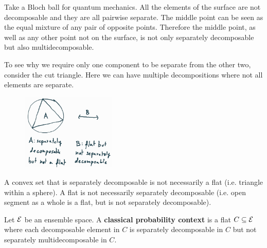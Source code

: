 \begin{mathSection}
\begin{remark}
		Take a Bloch ball for quantum mechanics. All the elements of the surface are not decomposable and they are all pairwise separate. The middle point can be seen as the equal mixture of any pair of opposite points. Therefore the middle point, as well as any other point not on the surface, is not only separately decomposable but also multidecomposable.
		
		To see why we require only one component to be separate from the other two, consider the cut triangle. Here we can have multiple decompositions where not all elements are separate.
	\end{remark}
	
	\begin{figure}[H]
		\centering
		\includegraphics[width=0.4\textwidth]{tempimages/SeparableButNotFlat.jpg}
	\end{figure}
	
	\begin{remark}
		A convex set that is separately decomposable is not necessarily a flat (i.e. triangle within a sphere). A flat is not necessarily separately decomposable (i.e. open segment as a whole is a flat, but is not separately decomposable).
	\end{remark}
\end{mathSection}

\begin{mathSection}
	\begin{defn}
		Let $\mathcal{E}$ be an ensemble space. A \textbf{classical probability context} is a flat $C \subseteq \mathcal{E}$ where each decomposable element in $C$ is separately decomposable in $C$ but not separately multidecomposable in $C$.
	\end{defn}
\end{mathSection}

